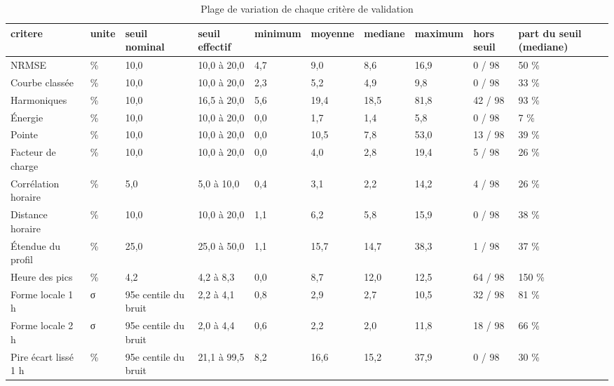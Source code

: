 \begin{table}[htbp]
\caption{Plage de variation de chaque critère de validation}
\label{tab:plages_criteres}
\begin{tabular}{llllllllll}
\toprule
critere & unite & seuil nominal & seuil effectif & minimum & moyenne & mediane & maximum & hors seuil & part du seuil (mediane) \\
\midrule
NRMSE & \% & 10,0 & 10,0 à 20,0 & 4,7 & 9,0 & 8,6 & 16,9 & 0 / 98 & 50 \% \\
Courbe classée & \% & 10,0 & 10,0 à 20,0 & 2,3 & 5,2 & 4,9 & 9,8 & 0 / 98 & 33 \% \\
Harmoniques & \% & 10,0 & 16,5 à 20,0 & 5,6 & 19,4 & 18,5 & 81,8 & 42 / 98 & 93 \% \\
Énergie & \% & 10,0 & 10,0 à 20,0 & 0,0 & 1,7 & 1,4 & 5,8 & 0 / 98 & 7 \% \\
Pointe & \% & 10,0 & 10,0 à 20,0 & 0,0 & 10,5 & 7,8 & 53,0 & 13 / 98 & 39 \% \\
Facteur de charge & \% & 10,0 & 10,0 à 20,0 & 0,0 & 4,0 & 2,8 & 19,4 & 5 / 98 & 26 \% \\
Corrélation horaire & \% & 5,0 & 5,0 à 10,0 & 0,4 & 3,1 & 2,2 & 14,2 & 4 / 98 & 26 \% \\
Distance horaire & \% & 10,0 & 10,0 à 20,0 & 1,1 & 6,2 & 5,8 & 15,9 & 0 / 98 & 38 \% \\
Étendue du profil & \% & 25,0 & 25,0 à 50,0 & 1,1 & 15,7 & 14,7 & 38,3 & 1 / 98 & 37 \% \\
Heure des pics & \% & 4,2 & 4,2 à 8,3 & 0,0 & 8,7 & 12,0 & 12,5 & 64 / 98 & 150 \% \\
Forme locale 1 h & σ & 95e centile du bruit & 2,2 à 4,1 & 0,8 & 2,9 & 2,7 & 10,5 & 32 / 98 & 81 \% \\
Forme locale 2 h & σ & 95e centile du bruit & 2,0 à 4,4 & 0,6 & 2,2 & 2,0 & 11,8 & 18 / 98 & 66 \% \\
Pire écart lissé 1 h & \% & 95e centile du bruit & 21,1 à 99,5 & 8,2 & 16,6 & 15,2 & 37,9 & 0 / 98 & 30 \% \\
\bottomrule
\end{tabular}
\end{table}
